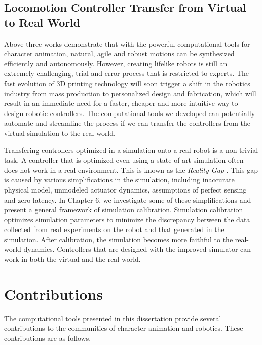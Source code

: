 \subsection{Locomotion Controller Transfer from Virtual to Real World}

Above three works demonstrate that with the powerful computational tools for character animation, natural, agile and robust motions can be synthesized efficiently and autonomously. However, creating lifelike robots is still an extremely challenging, trial-and-error process that is restricted to experts. The fast evolution of 3D printing technology will soon trigger a shift in the robotics industry from mass production to personalized design and fabrication, which will result in an immediate need for a faster, cheaper and more intuitive way to design robotic controllers. The computational tools we developed can potentially automate and streamline the process if we can transfer the controllers from the virtual simulation to the real world.

Transfering controllers optimized in a simulation onto a real robot is a non-trivial task. A controller that is optimized even using a state-of-art simulation often does not work in a real environment. This is known as the \emph{Reality Gap} \cite{}. This gap is caused by various simplifications in the simulation, including inaccurate physical model, unmodeled actuator dynamics, assumptions of perfect sensing and zero latency. In Chapter 6, we investigate some of these simplifications and present a general framework of simulation calibration. Simulation calibration optimizes simulation parameters to minimize the discrepancy between the data collected from real experiments on the robot and that generated in the simulation. After calibration, the simulation becomes more faithful to the real-world dynamics. Controllers that are designed with the improved simulator can work in both the virtual and the real world. 

\section{Contributions}

The computational tools presented in this dissertation provide several contributions to the communities of character animation and robotics. These contributions are as follows.

